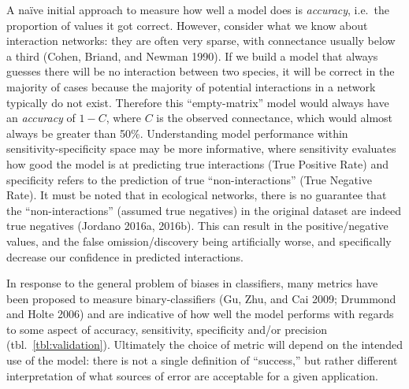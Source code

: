 \documentclass[11pt]{article}
\begin{document}
A naïve initial approach to measure how well a model does is
\emph{accuracy}, i.e.~the proportion of values it got correct. However,
consider what we know about interaction networks: they are often very
sparse, with connectance usually below a third (Cohen, Briand, and
Newman 1990). If we build a model that always guesses there will be no
interaction between two species, it will be correct in the majority of
cases because the majority of potential interactions in a network
typically do not exist. Therefore this ``empty-matrix'' model would
always have an \emph{accuracy} of \(1-C\), where \(C\) is the observed
connectance, which would almost always be greater than 50\%.
Understanding model performance within sensitivity-specificity space may
be more informative, where sensitivity evaluates how good the model is
at predicting true interactions (True Positive Rate) and specificity
refers to the prediction of true ``non-interactions'' (True Negative
Rate). It must be noted that in ecological networks, there is no
guarantee that the ``non-interactions'' (assumed true negatives) in the
original dataset are indeed true negatives (Jordano 2016a, 2016b). This
can result in the positive/negative values, and the false
omission/discovery being artificially worse, and specifically decrease
our confidence in predicted interactions.

In response to the general problem of biases in classifiers, many
metrics have been proposed to measure binary-classifiers (Gu, Zhu, and
Cai 2009; Drummond and Holte 2006) and are indicative of how well the
model performs with regards to some aspect of accuracy, sensitivity,
specificity and/or precision (tbl.~\ref{tbl:validation}). Ultimately the
choice of metric will depend on the intended use of the model: there is
not a single definition of ``success,'' but rather different
interpretation of what sources of error are acceptable for a given
application.
\end{document}
